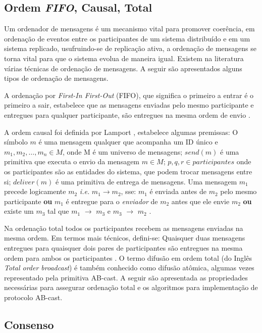 \documentclass[12pt]{article}
\begin{document}
\subsection{Ordem \textit{FIFO}, Causal, Total}

Um ordenador de mensagens é um mecanismo vital para promover coerência, em ordenação de eventos entre os participantes de um sistema distribuído e em um sistema replicado, usufruindo-se de replicação ativa, a ordenação de mensagens se torna vital para que o sistema evolua de maneira igual. Existem na literatura várias técnicas de ordenação de mensagens. A seguir são apresentados alguns tipos de ordenação de mensagens.

A ordenação por \textit{First-In First-Out} (FIFO), que significa o primeiro a entrar é o primeiro a sair, estabelece que as mensagens enviadas pelo mesmo participante e entregues para qualquer participante, são entregues na mesma ordem de envio \cite{PauloVerissimoLuisRodrigues}.

A ordem causal foi definida por Lamport \cite{lamport1978time}, estabelece algumas premissas: O símbolo $m$ é uma mensagem qualquer que acompanha um ID único e ${m_1, m_2, \dots, m_n} \in M$, onde M é um universo de mensagens; $send(m)$ é uma primitiva que executa o envio da mensagem $m \in M$; $p, q, r \in {participantes}$ onde os participantes são as entidades do sistema, que podem trocar mensagens entre si; $deliver(m)$ é uma primitiva de entrega de mensagens. Uma mensagem $m_1$ precede logicamente $m_2$ \textit{i.e.} $m_1 \longrightarrow m_2$, sse: $m_1$ é enviada antes de $m_2$ pelo mesmo participante \textbf{ou} $m_1$ é entregue para o \textit{enviador} de $m_2$ antes que ele envie $m_2$ \textbf{ou} existe um $m_3$ tal que $m_1$ $\longrightarrow$ $m_3$ e $m_3$ $\longrightarrow$ $m_2$ \cite{PauloVerissimoLuisRodrigues}.

Na ordenação total todos os participantes recebem as mensagens enviadas na mesma ordem. Em termos mais técnicos, defini-se: Quaisquer duas mensagens entregues para quaisquer dois pares de participantes são entregues na mesma ordem para ambos os participantes \cite{PauloVerissimoLuisRodrigues}. O termo difusão em ordem total (do Inglês \textit{Total order broadcast}) é também conhecido como difusão atômica, algumas vezes representado pela primitiva {AB-cast}. A seguir são apresentada as propriedades necessárias para assegurar ordenação total e os algoritmos para implementação de protocolo {AB-cast}.

\subsection{Consenso}
\end{document}
